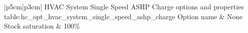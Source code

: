 \begin{customLongTable}{ |p{5cm}|p{3cm}| }
{HVAC System Single Speed ASHP Charge options and properties} {table:hc_opt_hvac_system_single_speed_ashp_charge}
{Option name & None}
\endhead
\hline
Stock saturation & 100\% \\ \hline
\end{customLongTable}
